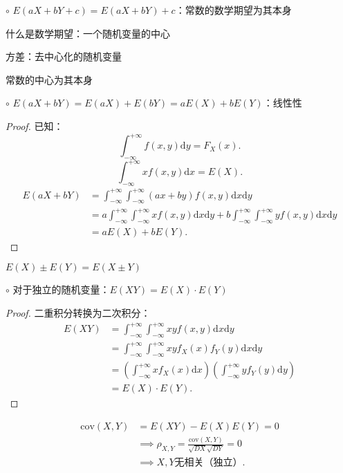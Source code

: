 $\circ$ $E\left( aX+bY+c \right) =E\left( aX+bY \right) +c$：常数的数学期望为其本身
\begin{notation}
    什么是数学期望：一个随机变量的中心

    方差：去中心化的随机变量

    常数的中心为其本身
\end{notation}
$\circ$ $E\left( aX+bY \right) =E\left( aX \right) +E\left( bY \right) =aE\left( X \right) +bE\left( Y \right) $：线性性
\begin{proof}
    已知：\[
        \int_{-\infty}^{+\infty} f\left( x,y \right)  \mathrm{d}y=F_X\left( x \right) 
    .\] 
    \[
        \int_{-\infty}^{+\infty} xf\left( x,y \right)  \mathrm{d}x=E\left( X \right) 
    .\] 
    \begin{align*}
        E\left( aX+bY \right) &=\int_{-\infty}^{+\infty} \int_{-\infty}^{+\infty} \left( ax+by \right) f\left( x,y \right)  \mathrm{d}x \mathrm{d}y \\
        &= a \int_{-\infty}^{+\infty} \int_{-\infty}^{+\infty} xf\left( x,y \right)  \mathrm{d}x \mathrm{d}y +b \int_{-\infty}^{+\infty} \int_{-\infty}^{+\infty} yf\left( x,y \right)  \mathrm{d}x  \mathrm{d}y\\
        &= aE\left( X \right) +bE\left( Y \right)
    .\end{align*}
\end{proof}
\begin{eg}
    $E\left( X \right) \pm E\left( Y \right) =E\left( X\pm Y \right) $
\end{eg}

$\circ$ 对于独立的随机变量：$E\left( XY \right) =E\left( X \right) \cdot E\left( Y \right) $
\begin{proof}
    二重积分转换为二次积分：
    \begin{align*}
        E\left( XY \right) &=\int_{-\infty}^{+\infty} \int_{-\infty}^{+\infty} xyf\left( x,y \right)  \mathrm{d}x \mathrm{d}y\\
        &= \int_{-\infty}^{+\infty} \int_{-\infty}^{+\infty} xyf_X\left( x \right) f_Y\left( y \right)  \mathrm{d}x \mathrm{d}y \\
        &= \left( \int_{-\infty}^{+\infty} xf_X\left( x \right)  \mathrm{d}x \right) \left( \int_{-\infty}^{+\infty} yf_Y\left( y \right)  \mathrm{d}y \right)  \\
        &= E\left( X \right) \cdot E\left( Y \right)
    .\end{align*}
\end{proof}
\begin{notation}
    \begin{align*}
        \text{cov}\left( X,Y \right) &=E\left( XY \right) -E\left( X \right) E\left( Y \right)=0\\
        &\implies \rho_{X,Y}=\frac{\text{cov}\left( X,Y \right) }{\sqrt{DX} \sqrt{DY} }=0\\
        &\implies X,Y\text{无相关（独立）}
    .\end{align*}
\end{notation}

